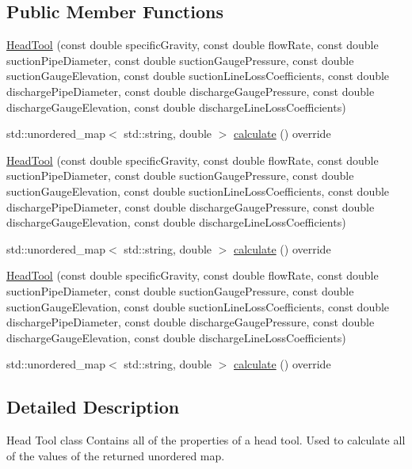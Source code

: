 \subsection*{Public Member Functions}
\begin{DoxyCompactItemize}
\item 
\hyperlink{class_head_tool_a9934c87c8f8eb515ff32e46c74004c0e}{Head\+Tool} (const double specific\+Gravity, const double flow\+Rate, const double suction\+Pipe\+Diameter, const double suction\+Gauge\+Pressure, const double suction\+Gauge\+Elevation, const double suction\+Line\+Loss\+Coefficients, const double discharge\+Pipe\+Diameter, const double discharge\+Gauge\+Pressure, const double discharge\+Gauge\+Elevation, const double discharge\+Line\+Loss\+Coefficients)
\item 
std\+::unordered\+\_\+map$<$ std\+::string, double $>$ \hyperlink{class_head_tool_ab107e7717df4ca95404ce1952c21a84e}{calculate} () override
\item 
\hyperlink{class_head_tool_a9934c87c8f8eb515ff32e46c74004c0e}{Head\+Tool} (const double specific\+Gravity, const double flow\+Rate, const double suction\+Pipe\+Diameter, const double suction\+Gauge\+Pressure, const double suction\+Gauge\+Elevation, const double suction\+Line\+Loss\+Coefficients, const double discharge\+Pipe\+Diameter, const double discharge\+Gauge\+Pressure, const double discharge\+Gauge\+Elevation, const double discharge\+Line\+Loss\+Coefficients)
\item 
std\+::unordered\+\_\+map$<$ std\+::string, double $>$ \hyperlink{class_head_tool_a146eaf45d39cf6d691fa10b4b80b5e9e}{calculate} () override
\item 
\hyperlink{class_head_tool_a9934c87c8f8eb515ff32e46c74004c0e}{Head\+Tool} (const double specific\+Gravity, const double flow\+Rate, const double suction\+Pipe\+Diameter, const double suction\+Gauge\+Pressure, const double suction\+Gauge\+Elevation, const double suction\+Line\+Loss\+Coefficients, const double discharge\+Pipe\+Diameter, const double discharge\+Gauge\+Pressure, const double discharge\+Gauge\+Elevation, const double discharge\+Line\+Loss\+Coefficients)
\item 
std\+::unordered\+\_\+map$<$ std\+::string, double $>$ \hyperlink{class_head_tool_a146eaf45d39cf6d691fa10b4b80b5e9e}{calculate} () override
\end{DoxyCompactItemize}


\subsection{Detailed Description}
Head Tool class Contains all of the properties of a head tool. Used to calculate all of the values of the returned unordered map. 

